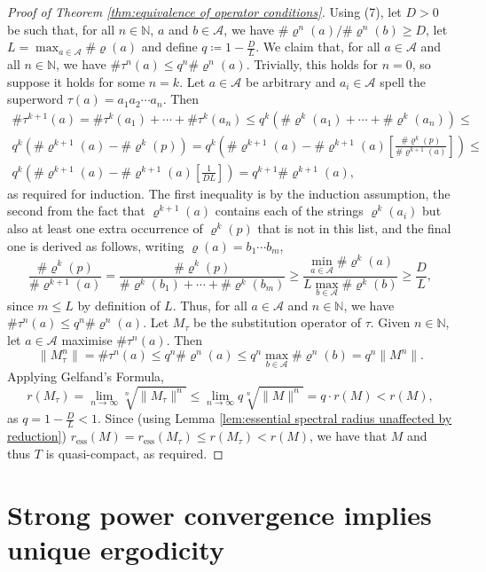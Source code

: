 \documentclass[11pt]{amsart}
\numberwithin{equation}{section}
\theoremstyle{plain}
\theoremstyle{definition}
\newcommand{\N}{{\mathbb N}}
\newcommand{\mc}{\mathcal}
\newcommand{\A}{\mc A}
\newcommand{\sub}{\varrho}
\begin{document}
\begin{proof}[Proof of Theorem \ref{thm:equivalence of operator conditions}]
Using (7), let \(D > 0\) be such that, for all \(n \in \N\), \(a\) and \(b \in \A\), we have \(\# \sub^n(a) / \# \sub^n(b) \geq D\), let \(L = \max_{a \in \A} \# \sub(a)\) and define \(q \coloneqq 1 - \frac{D}{L}\). We claim that, for all \(a \in \A\) and all \(n \in \N\), we have \(\# \tau^n(a) \leq q^n \# \sub^n(a)\). Trivially, this holds for \(n=0\), so suppose it holds for some \(n = k\). Let \(a \in \A\) be arbitrary and \(a_i \in \A\) spell the superword \(\tau(a) = a_1 a_2 \cdots a_n\). Then
\begin{align*}
\# \tau^{k+1}(a) = \# \tau^k(a_1) + \cdots + \# \tau^k(a_n) \leq q^k(\# \sub^k(a_1) + \cdots + \# \sub^k(a_n)) \leq \\
q^k( \# \sub^{k+1}(a) - \# \sub^k(p)) = q^k\left( \# \sub^{k+1}(a) - \# \sub^{k+1}(a) \left[\frac{\# \sub^k(p)}{\# \sub^{k+1}(a)} \right] \right) \leq \\
q^k\left( \# \sub^{k+1}(a) - \# \sub^{k+1}(a) \left[ \frac{1}{DL} \right] \right) =  q^{k+1}\# \sub^{k+1}(a) ,
\end{align*}
as required for induction. The first inequality is by the induction assumption, the second from the fact that \(\sub^{k+1}(a)\) contains each of the strings \(\sub^k(a_i)\) but also at least one extra occurrence of \(\sub^k(p)\) that is not in this list, and the final one is derived as follows, writing \(\sub(a) = b_1 \cdots b_m\),
\[
\frac{\# \sub^k(p)}{\# \sub^{k+1}(a)} = \frac{\# \sub^k(p)}{\# \sub^k(b_1) + \cdots + \# \sub^k(b_m)} \geq \frac{\min_{a \in \A} \# \sub^k(a)}{L \max_{b \in \A} \# \sub^k(b)} \geq \frac{D}{L} ,
\]
since \(m \leq L\) by definition of \(L\). Thus, for all \(a \in \A\) and \(n \in \N\), we have \(\# \tau^n(a) \leq q^n \# \sub^n(a)\). Let \(M_\tau\) be the substitution operator of \(\tau\). Given \(n \in \N\), let \(a \in \A\) maximise \(\# \tau^n(a)\). Then
\[
\|M_\tau^n\| = \# \tau^n(a) \leq q^n \# \sub^n(a) \leq q^n \max_{b \in \A} \# \sub^n(b) = q^n\|M^n\| .
\]
Applying Gelfand's Formula,
\[
r(M_\tau) = \lim_{n \to \infty} \sqrt[n]{\|M_\tau\|^n} \leq \lim_{n \to \infty} q \sqrt[n]{\|M\|^n} = q \cdot r(M) < r(M) ,
\]
as \(q = 1 - \frac{D}{L} < 1\). Since (using Lemma \ref{lem:essential spectral radius unaffected by reduction}) \(r_\mathrm{ess}(M) = r_\mathrm{ess}(M_\tau) \leq r(M_\tau) < r(M)\), we have that \(M\) and thus \(T\) is quasi-compact, as required.
\end{proof}

\appendix
\section{Strong power convergence implies unique ergodicity}
\end{document}
